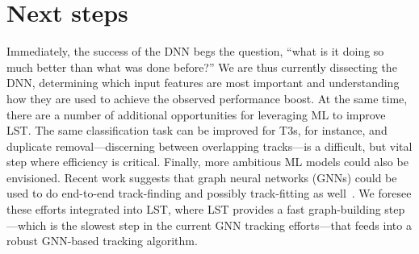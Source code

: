 \section{Next steps}
Immediately, the success of the DNN begs the question, ``what is it doing so much better than what was done before?'' 
We are thus currently dissecting the DNN, determining which input features are most important and understanding how they are used to achieve the observed performance boost. 
At the same time, there are a number of additional opportunities for leveraging ML to improve LST. 
The same classification task can be improved for T3s, for instance, and duplicate removal---discerning between overlapping tracks---is a difficult, but vital step where efficiency is critical. 
Finally, more ambitious ML models could also be envisioned. 
Recent work suggests that graph neural networks (GNNs) could be used to do end-to-end track-finding and possibly track-fitting as well~\cite{Ju2021, DeZoortNature2023, lieret2023object}. 
We foresee these efforts integrated into LST, where LST provides a fast graph-building step---which is the slowest step in the current GNN tracking efforts---that feeds into a robust GNN-based tracking algorithm.
